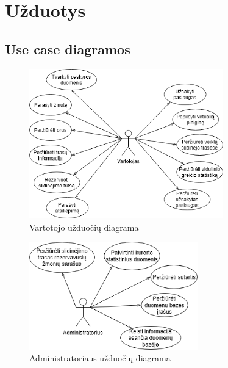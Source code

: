 \documentclass[oneside]{VUMIFPSkursinis}
\begin{document}
\section{Užduotys}
\subsection{Use case diagramos}
\begin{figure}[h]
    \centering
    \includegraphics[width=0.75\textwidth]{useCaseVartotojas.png}
    \caption{Vartotojo užduočių diagrama}
    \label{fig:VartotojoUseCasel}
\end{figure}
\vskip 1cm
\begin{figure}[h]
    \centering
    \includegraphics[width=0.65\textwidth]{useCaseAdministratorius.png}
    \caption{Administratoriaus užduočių diagrama}
    \label{fig:AdministratoriausUseCase}
\end{figure}
\end{document}

